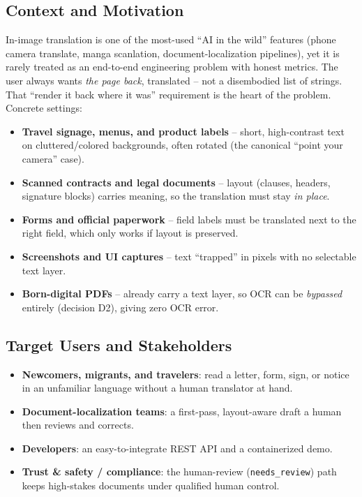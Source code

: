 \documentclass[12pt,a4paper]{article}
\begin{document}
\subsection{Context and Motivation}

In-image translation is one of the most-used ``AI in the wild'' features (phone camera translate, manga scanlation, document-localization pipelines), yet it is rarely treated as an end-to-end engineering problem with honest metrics. The user always wants \emph{the page back}, translated -- not a disembodied list of strings. That ``render it back where it was'' requirement is the heart of the problem. Concrete settings:

\begin{itemize}
  \item \textbf{Travel signage, menus, and product labels} -- short, high-contrast text on cluttered/colored backgrounds, often rotated (the canonical ``point your camera'' case).
  \item \textbf{Scanned contracts and legal documents} -- layout (clauses, headers, signature blocks) carries meaning, so the translation must stay \emph{in place}.
  \item \textbf{Forms and official paperwork} -- field labels must be translated next to the right field, which only works if layout is preserved.
  \item \textbf{Screenshots and UI captures} -- text ``trapped'' in pixels with no selectable text layer.
  \item \textbf{Born-digital PDFs} -- already carry a text layer, so OCR can be \emph{bypassed} entirely (decision D2), giving zero OCR error.
\end{itemize}

\subsection{Target Users and Stakeholders}

\begin{itemize}
  \item \textbf{Newcomers, migrants, and travelers}: read a letter, form, sign, or notice in an unfamiliar language without a human translator at hand.
  \item \textbf{Document-localization teams}: a first-pass, layout-aware draft a human then reviews and corrects.
  \item \textbf{Developers}: an easy-to-integrate REST API and a containerized demo.
  \item \textbf{Trust \& safety / compliance}: the human-review (\texttt{needs\_review}) path keeps high-stakes documents under qualified human control.
\end{itemize}
\end{document}
